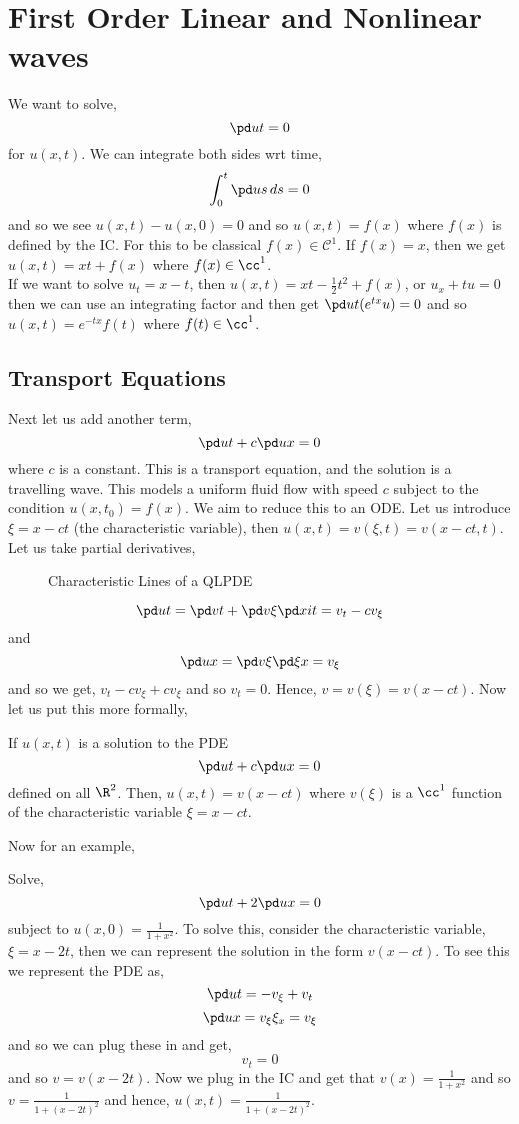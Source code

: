\section{First Order Linear and Nonlinear waves}
We want to solve,
$$ \pd u t = 0 $$
for $u(x, t)$. We can integrate both sides wrt time,
$$ \int_0^t \pd u s \, ds = 0 $$
and so we see $u(x, t) - u(x, 0) = 0$ and so $u(x, t) = f(x)$ where $f(x)$ is defined by the IC. For this to be classical $f(x) \in \mathcal{C}^1$. If $f(x) = x$, then we get $u(x, t) = xt + f(x)$ where $f(x) \in \cc^1$.\\

\noindent
If we want to solve $u_t = x - t$, then $u(x, t) = xt - \frac{1}{2}t^2 + f(x)$, or $u_x + tu = 0$ then we can use an integrating factor and then get $\pd u t (e^{tx}u) = 0$ and so $u(x, t) = e^{-tx}f(t)$ where $f(t) \in \cc^1$.\\

\subsection{Transport Equations}

Next let us add another term,
$$\pd u t + c\pd u x = 0$$
where $c$ is a constant. This is a transport equation, and the solution is a travelling wave. This models a uniform fluid flow with speed $c$ subject to the condition $u(x, t_0) = f(x)$. We aim to reduce this to an ODE. Let us introduce $\xi = x - ct$ (the characteristic variable), then $u(x, t) = v(\xi, t) = v(x - ct, t)$. Let us take partial derivatives,

\begin{wrapfigure}{r}{0.5\textwidth}
  \centering
  \resizebox{0.5\textwidth}{!}{}
  \caption{Characteristic Lines of a QLPDE}
\end{wrapfigure}

$$ \pd u t = \pd v t + \pd v \xi \pd xi t = v_t - cv_\xi$$
and
$$ \pd u x = \pd v \xi \pd \xi x = v_\xi $$
and so we get, $v_t - cv_\xi + cv_\xi$ and so $v_t = 0$. Hence, $v = v(\xi) = v(x - ct)$. Now let us put this more formally,
\begin{nprop}
   If $u(x, t)$ is a solution to the PDE
   $$\pd u t + c\pd u x = 0$$
   defined on all $\R^2$. Then, $u(x, t) = v(x - ct)$ where $v(\xi)$ is a $\cc^1$ function of the characteristic variable $\xi = x - ct$.
\end{nprop}

\noindent
Now for an example,
\begin{eg}
  Solve,
  $$ \pd u t + 2\pd u x = 0 $$
  subject to $u(x, 0) = \frac{1}{1 + x^2}$. To solve this, consider the characteristic variable, $\xi = x - 2t$, then we can represent the solution in the form $v(x - ct)$. To see this we represent the PDE as,
  $$ \pd u t = -v_\xi + v_t $$
  $$ \pd u x = v_\xi\xi_x = v_\xi $$
  and so we can plug these in and get,
  $$ v_t = 0 $$
  and so $v = v(x - 2t)$. Now we plug in the IC and get that $v(x) = \frac{1}{1 + x^2}$ and so $v = \frac{1}{1 + (x - 2t)^2}$ and hence, $u(x, t) = \frac{1}{1 + (x - 2t)^2}$.
\end{eg}

